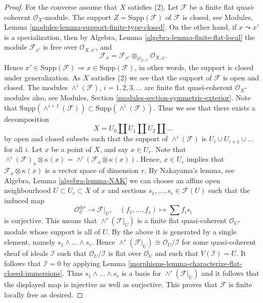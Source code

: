 \begin{proof}
\medskip\noindent
For the converse assume that $X$ satisfies (2).
Let $\mathcal{F}$ be a finite flat quasi-coherent $\mathcal{O}_X$-module.
The support $Z = \text{Supp}(\mathcal{F})$ of $\mathcal{F}$ is closed, see
Modules, Lemma \ref{modules-lemma-support-finite-type-closed}.
On the other hand, if $x \leadsto x'$ is a specialization, then by
Algebra, Lemma \ref{algebra-lemma-finite-flat-local}
the module $\mathcal{F}_{x'}$ is free over $\mathcal{O}_{X, x'}$, and
$$
\mathcal{F}_x =
\mathcal{F}_{x'} \otimes_{\mathcal{O}_{X, x'}} \mathcal{O}_{X, x}.
$$
Hence
$x' \in \text{Supp}(\mathcal{F}) \Rightarrow x \in \text{Supp}(\mathcal{F})$,
in other words, the support is closed under generalization.
As $X$ satisfies (2) we see that the support of $\mathcal{F}$
is open and closed. The modules $\wedge^i(\mathcal{F})$, $i = 1, 2, 3, \ldots$
are finite flat quasi-coherent $\mathcal{O}_X$-modules
also, see
Modules, Section \ref{modules-section-symmetric-exterior}.
Note that
$\text{Supp}(\wedge^{i + 1}(\mathcal{F})) \subset
\text{Supp}(\wedge^i(\mathcal{F}))$.
Thus we see that there exists a decomposition
$$
X = U_0 \amalg U_1 \amalg U_2 \amalg \ldots
$$
by open and closed subsets such that the support of
$\wedge^i(\mathcal{F})$ is $U_i \cup U_{i + 1} \cup \ldots$ for all $i$.
Let $x$ be a point of $X$, and say $x \in U_r$.
Note that
$\wedge^i(\mathcal{F})_x \otimes \kappa(x) =
\wedge^i(\mathcal{F}_x \otimes \kappa(x))$.
Hence, $x \in U_r$ implies that $\mathcal{F}_x \otimes \kappa(x)$
is a vector space of dimension $r$. By Nakayama's lemma, see
Algebra, Lemma \ref{algebra-lemma-NAK}
we can choose an affine open neighbourhood $U \subset U_r \subset X$
of $x$ and sections $s_1, \ldots, s_r \in \mathcal{F}(U)$ such that
the induced map
$$
\mathcal{O}_U^{\oplus r} \longrightarrow \mathcal{F}|_U, \quad
(f_1, \ldots, f_r) \longmapsto \sum f_i s_i
$$
is surjective. This means that
$\wedge^r(\mathcal{F}|_U)$ is a finite flat quasi-coherent
$\mathcal{O}_U$-module whose support is all of $U$.
By the above it is generated by a single element, namely
$s_1 \wedge \ldots \wedge s_r$. Hence
$\wedge^r(\mathcal{F}|_U) \cong \mathcal{O}_U/\mathcal{I}$
for some quasi-coherent sheaf of ideals $\mathcal{I}$
such that $\mathcal{O}_U/\mathcal{I}$ is flat over $\mathcal{O}_U$ and
such that $V(\mathcal{I}) = U$.
It follows that $\mathcal{I} = 0$ by applying
Lemma \ref{morphisms-lemma-characterize-flat-closed-immersions}.
Thus $s_1 \wedge \ldots \wedge s_r$ is a basis for
$\wedge^r(\mathcal{F}|_U)$ and it follows that the displayed map is injective
as well as surjective. This proves that $\mathcal{F}$ is finite locally free
as desired.
\end{proof}

